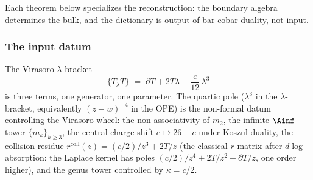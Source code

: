 Each theorem below specializes the reconstruction:
the boundary algebra determines the bulk, and the
dictionary is output of bar-cobar duality, not input.

\subsubsection*{The input datum}

The Virasoro $\lambda$-bracket
\begin{equation}\label{eq:gravity-input}
\{T{}_\lambda T\}
\;=\;
\partial T + 2T\lambda + \frac{c}{12}\,\lambda^3
\end{equation}
is three terms, one generator, one parameter. The quartic pole
($\lambda^3$ in the $\lambda$-bracket, equivalently
$(z-w)^{-4}$ in the OPE) is the non-formal datum controlling
the Virasoro wheel: the non-associativity of $m_2$, the infinite
$\Ainf$ tower $\{m_k\}_{k \ge 3}$, the central charge shift
$c \mapsto 26-c$ under Koszul duality, the collision residue
$r^{\mathrm{coll}}(z) = (c/2)/z^3 + 2T/z$
(the classical $r$-matrix after $d\log$ absorption:
the Laplace kernel has poles $(c/2)/z^4 + 2T/z^2 + \partial T/z$,
one order higher), and the genus tower controlled by
$\kappa = c/2$.

